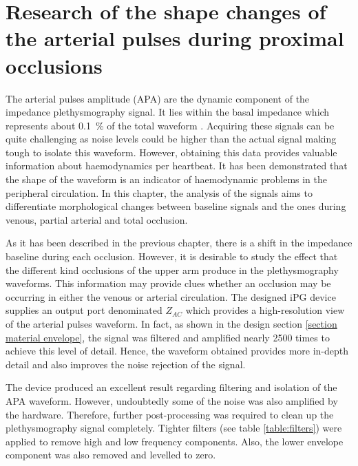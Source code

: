 
\chapter{Research of the shape changes of the arterial pulses during proximal occlusions}  %
\label{chapter apa}

\ifpdf
\graphicspath{{Chapter7/Figs/Raster/}{Chapter7/Figs/PDF/}{Chapter7/Figs/}}
\else
\graphicspath{{Chapter7/Figs/Vector/}{Chapter7/Figs/}}
\fi

The arterial pulses amplitude (APA) are the dynamic component of the impedance plethysmography signal. It lies within the basal impedance which represents about \SI{0.1}{\percent} of the total waveform \cite{anderson1984impedance}. Acquiring these signals can be quite challenging as noise levels could be higher than the actual signal making tough to isolate this waveform. However, obtaining this data provides valuable information about haemodynamics per heartbeat. It has been demonstrated that the shape of the waveform is an indicator of haemodynamic problems in the peripheral circulation. In this chapter, the analysis of the signals aims to differentiate morphological changes between baseline signals and the ones during venous, partial arterial and total occlusion.

As it has been described in the previous chapter, there is a shift in the impedance baseline during each occlusion. However, it is desirable to study the effect that the different kind occlusions of the upper arm produce in the plethysmography waveforms.  This information may provide clues whether an occlusion may be occurring in either the venous or arterial circulation.  The designed iPG device supplies an output port denominated $Z_{AC}$ which provides a high-resolution view of the arterial pulses waveform.  In fact, as shown in the design section \ref{section material envelope}, the signal was filtered and amplified nearly 2500 times to achieve this level of detail. Hence, the waveform obtained provides more in-depth detail and also improves the noise rejection of the signal.

The device produced an excellent result regarding filtering and isolation of the APA waveform. However, undoubtedly some of the noise was also amplified by the hardware. Therefore, further post-processing was required to clean up the plethysmography signal completely. Tighter filters (see table \ref{table:filters}) were applied to remove high and low frequency components. Also, the lower envelope component was also removed and levelled to zero.

